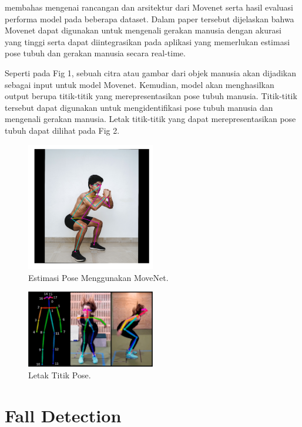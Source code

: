 \documentclass[conference]{IEEEtran}
\begin{document}
\cite{b2} membahas mengenai rancangan dan arsitektur dari Movenet serta hasil evaluasi performa model pada beberapa dataset. Dalam paper tersebut dijelaskan bahwa Movenet dapat digunakan untuk mengenali gerakan manusia dengan akurasi yang tinggi serta dapat diintegrasikan pada aplikasi yang memerlukan estimasi pose tubuh dan gerakan manusia secara real-time.

Seperti pada Fig 1, sebuah citra atau gambar dari objek manusia akan dijadikan sebagai input untuk model Movenet. Kemudian, model akan menghasilkan output berupa titik-titik yang merepresentasikan pose tubuh manusia. Titik-titik tersebut dapat digunakan untuk mengidentifikasi pose tubuh manusia dan mengenali gerakan manusia. Letak titik-titik yang dapat merepresentasikan pose tubuh dapat dilihat pada Fig 2.

\begin{figure}[htbp]
    \centerline{\includegraphics[width=0.5\textwidth]{figures/movenet1.png}}
    \caption{Estimasi Pose Menggunakan MoveNet.}
\end{figure}

\begin{figure}[htbp]
    \centerline{\includegraphics[width=0.5\textwidth]{figures/movenet2.png}}
    \caption{Letak Titik Pose.}
\end{figure}

\section{Fall Detection}
\end{document}

